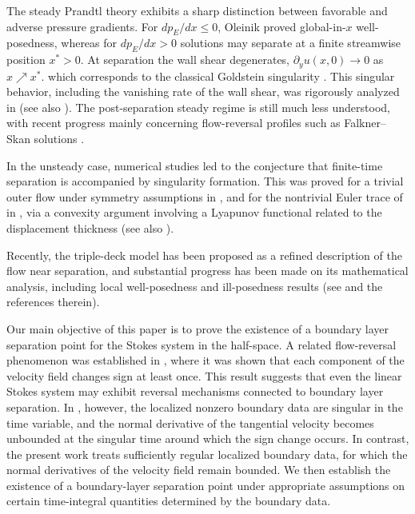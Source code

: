 \documentclass{amsart}
\numberwithin{equation}{section}
\begin{document}
The steady Prandtl theory exhibits a sharp distinction between favorable and
adverse pressure gradients.  For \(d p_E/dx\leq 0\), Oleinik \cite{Oleinik}
proved global-in-\(x\) well-posedness, whereas for \(d p_E/dx>0\) solutions may
separate at a finite streamwise position \(x^*>0\).  At separation the wall
shear degenerates,
$\partial_y u(x,0)\to 0$
as $x\nearrow x^*$.
which corresponds to the classical Goldstein singularity \cite{Goldstein}.
This singular behavior, including the vanishing rate of the wall shear, was
rigorously analyzed in \cite{Dali-Mas} (see also \cite{SWZ}).  The
post-separation steady regime is still much less understood, with recent
progress mainly concerning flow-reversal profiles such as Falkner--Skan
solutions \cites{masreversal,dalireversal}.  

In the unsteady case, numerical
studies \cites{vanshen1,vanshen2} led to the conjecture that finite-time
separation is accompanied by singularity formation.  This was proved for a
trivial outer flow under symmetry assumptions in \cite{eng}, and for the
nontrivial Euler trace of \cite{vanshen1} in \cite{kvw}, via a convexity
argument involving a Lyapunov functional related to the displacement thickness (see also \cites{unsteadyinvisicid,unsteadyviscous}).

Recently, the triple-deck model has been proposed as a refined description of the flow near separation, and substantial progress has been made on its mathematical analysis, including local well-posedness and ill-posedness results (see \cites{Iyervicol, iyermaekawa, Dietertvaret, Varetiyer} and the references therein).

Our main objective of this paper is to prove the existence of a boundary layer
separation point for the Stokes system in the half-space.  A related flow-reversal
phenomenon was established in \cite{CKM26}, where it was shown that each
component of the velocity field changes sign at least once.  This result suggests
that even the linear Stokes system may exhibit reversal mechanisms connected to
boundary layer separation.  In \cite{CKM26}, however, the localized nonzero
boundary data are singular in the time variable, and the normal derivative of
the tangential velocity becomes unbounded at the singular time around which the
sign change occurs.  In contrast, the present work treats sufficiently regular
localized boundary data, for which the normal derivatives of the velocity field
remain bounded.  We then establish the existence of a boundary-layer separation
point under appropriate assumptions on certain time-integral quantities
determined by the boundary data.
\end{document}
